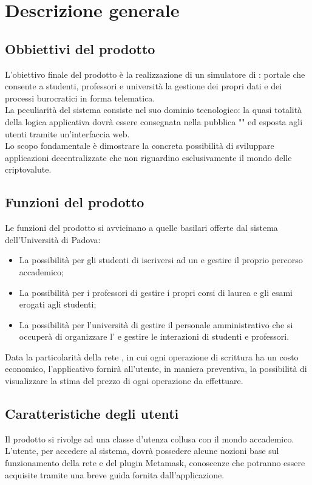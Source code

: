 \documentclass[AnalisiDeiRequisiti.tex]{subfiles}
\begin{document}
\chapter{Descrizione generale}
\section{Obbiettivi del prodotto}
L'obiettivo finale del prodotto è la realizzazione di un simulatore di : portale che consente a studenti, professori e università la gestione dei propri dati e dei processi burocratici in forma telematica. \\
La peculiarità del sistema consiste nel suo dominio tecnologico: la quasi totalità della logica applicativa dovrà essere consegnata nella  pubblica "" ed esposta agli utenti tramite un'interfaccia web. \\
Lo scopo fondamentale è dimostrare la concreta possibilità di sviluppare applicazioni decentralizzate che non riguardino esclusivamente il mondo delle criptovalute.

\section{Funzioni del prodotto}
Le funzioni del prodotto si avvicinano a quelle basilari offerte dal sistema  dell'Università di Padova:
\begin{itemize}
	\item La possibilità per gli studenti di iscriversi ad un  e gestire il proprio percorso accademico;
	\item La possibilità per i professori di gestire i propri corsi di laurea e gli esami erogati agli studenti;
	\item La possibilità per l'università di gestire il personale amministrativo che si occuperà di organizzare l' e gestire le interazioni di studenti e professori.
\end{itemize}
Data la particolarità della rete , in cui ogni operazione di scrittura ha un costo economico, l'applicativo fornirà all'utente, in maniera preventiva, la possibilità di visualizzare la stima del prezzo di ogni operazione da effettuare.


\section{Caratteristiche degli utenti}
Il prodotto si rivolge ad una classe d'utenza collusa con il mondo accademico.\\
L'utente, per accedere al sistema, dovrà possedere alcune nozioni base sul funzionamento della rete  e del plugin Metamask, conoscenze che potranno essere acquisite tramite una breve guida fornita dall'applicazione.
\end{document}
